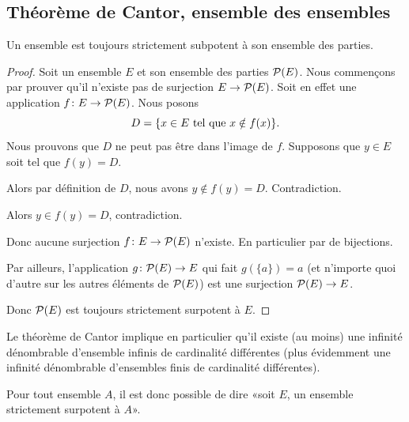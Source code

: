 \subsection{Théorème de Cantor, ensemble des ensembles}

\begin{theorem}     \label{THOooJPNFooWSxUhd}
    Un ensemble est toujours strictement subpotent à son ensemble des parties.
\end{theorem}

\begin{proof}
    Soit un ensemble \( E\) et son ensemble des parties \( \mathcal{P}(E)\). Nous commençons par prouver qu'il n'existe pas de surjection \( E\to \mathcal{P}(E)\). Soit en effet une application \( f\colon E\to \mathcal{P}(E)\). Nous posons
    \begin{equation}
        D=\{ x\in E\text{ tel que } x\notin f(x) \}.
    \end{equation}
    Nous prouvons que \( D\) ne peut pas être dans l'image de \( f\). Supposons que \( y\in E\) soit tel que \( f(y)=D\).
    \begin{subproof}
        \item[Si \( y\in D\)]
            Alors par définition de \( D\), nous avons \( y\notin f(y)=D\). Contradiction.
        \item[Si \( y\notin D\)]
            Alors \( y\in f(y)=D\), contradiction.
    \end{subproof}
    Donc aucune surjection \( f\colon E\to \mathcal{P}(E)\) n'existe. En particulier par de bijections.

    Par ailleurs, l'application \( g\colon \mathcal{P}(E)\to E\) qui fait \( g(\{ a \})=a\) (et n'importe quoi d'autre sur les autres éléments de \( \mathcal{P}(E)\)) est une surjection \( \mathcal{P}(E)\to E\).

    Donc \( \mathcal{P}(E)\) est toujours strictement surpotent à \( E\).
\end{proof}

\begin{normaltext}
    Le théorème de Cantor implique en particulier qu'il existe (au moins) une infinité dénombrable d'ensemble infinis de cardinalité différentes (plus évidemment une infinité dénombrable d'ensembles finis de cardinalité différentes).

    Pour tout ensemble \( A\), il est donc possible de dire «soit \( E\), un ensemble strictement surpotent à \( A\)».
\end{normaltext}

